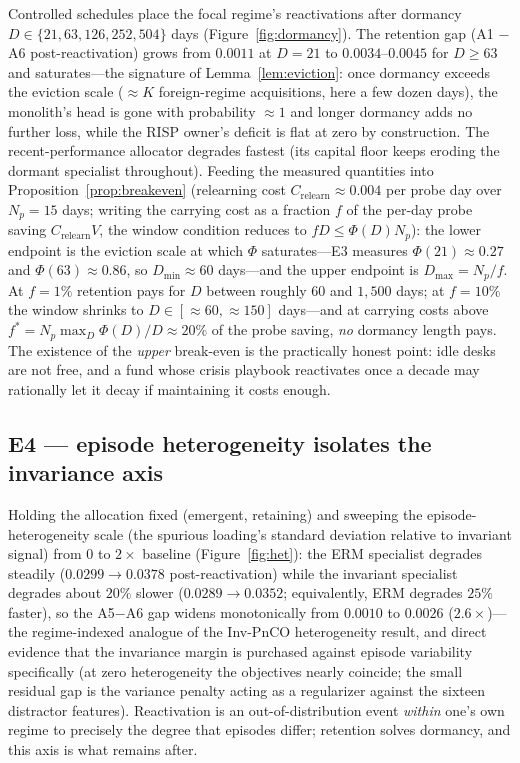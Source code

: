 \documentclass{article}
\newcommand{\nm}{\textsc{RISP}}
\begin{document}
Controlled schedules place the focal regime's reactivations after dormancy
$D \in \{21, 63, 126, 252, 504\}$ days (Figure~\ref{fig:dormancy}). The
retention gap (A1 $-$ A6 post-reactivation) grows from $0.0011$ at
$D = 21$ to $0.0034$--$0.0045$ for $D \ge 63$ and saturates---the
signature of Lemma~\ref{lem:eviction}: once dormancy exceeds the eviction
scale ($\approx K$ foreign-regime acquisitions, here a few dozen days),
the monolith's head is gone with probability $\approx 1$ and longer
dormancy adds no further loss, while the \nm{} owner's deficit is flat at
zero by construction. The recent-performance allocator degrades fastest
(its capital floor keeps eroding the dormant specialist throughout).
Feeding the measured quantities into Proposition~\ref{prop:breakeven}
(relearning cost $C_{\mathrm{relearn}} \approx 0.004$ per probe day over
$N_p = 15$ days; writing the carrying cost as a fraction $f$ of the
per-day probe saving $C_{\mathrm{relearn}} V$, the window condition reduces
to $f D \le \Phi(D) N_p$): the lower endpoint is the eviction scale at
which $\Phi$ saturates---E3 measures $\Phi(21) \approx 0.27$ and
$\Phi(63) \approx 0.86$, so $D_{\min} \approx 60$ days---and the upper
endpoint is $D_{\max} = N_p / f$. At $f = 1\%$ retention pays for $D$
between roughly $60$ and $1{,}500$ days; at $f = 10\%$ the window shrinks
to $D \in [\approx 60, \approx 150]$ days---and at carrying costs above
$f^{*} = N_p \max_D \Phi(D)/D \approx 20\%$ of the probe saving, \emph{no}
dormancy length pays. The
existence of the \emph{upper} break-even is the practically honest point:
idle desks are not free, and a fund whose crisis playbook reactivates
once a decade may rationally let it decay if maintaining it costs enough.

\subsection{E4 --- episode heterogeneity isolates the invariance axis}
\label{sec:e4}

Holding the allocation fixed (emergent, retaining) and sweeping the
episode-heterogeneity scale (the spurious loading's standard deviation
relative to invariant signal) from $0$ to $2\times$ baseline
(Figure~\ref{fig:het}): the ERM specialist degrades steadily
($0.0299 \to 0.0378$ post-reactivation) while the invariant specialist
degrades about $20\%$ slower ($0.0289 \to 0.0352$; equivalently, ERM
degrades $25\%$ faster), so the A5$-$A6 gap
widens monotonically from $0.0010$ to $0.0026$ ($2.6\times$)---the regime-indexed analogue
of the Inv-PnCO heterogeneity result, and direct evidence that the
invariance margin is purchased against episode variability specifically
(at zero heterogeneity the objectives nearly coincide; the small residual
gap is the variance penalty acting as a regularizer against the sixteen
distractor features). Reactivation is an out-of-distribution event
\emph{within} one's own regime to precisely the degree that episodes
differ; retention solves dormancy, and this axis is what remains after.
\end{document}
